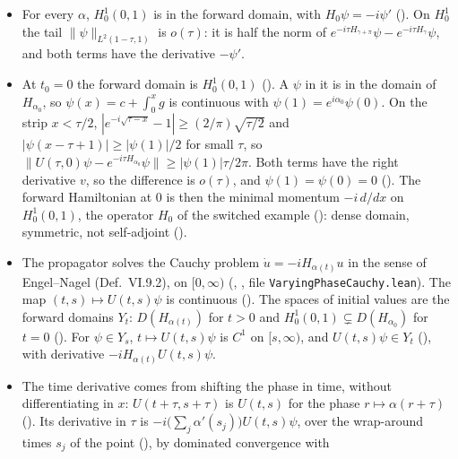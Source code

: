 \documentclass[11pt]{article}
\begin{document}
\begin{itemize}
\begin{itemize}
    every $t_0 \ne 0$ (): there the forward Hamiltonian is the
    self-adjoint $H_{\alpha(t_0)}$.
  \item For every $\alpha$, $H^1_0(0,1)$ is in the forward domain, with $H_0\psi = -i\psi'$
    (). On $H^1_0$ the tail
    $\|\psi\|_{L^2(1-\tau,1)}$ is $o(\tau)$: it is half the norm of
    $e^{-i\tau H_{\gamma+\pi}}\psi - e^{-i\tau H_\gamma}\psi$, and both terms have the derivative
    $-\psi'$.
  \item At $t_0 = 0$ the forward domain is $H^1_0(0,1)$ (). A $\psi$
    in it is in the domain of $H_{\alpha_0}$, so $\psi(x) = c + \int_0^x g$ is continuous with
    $\psi(1) = e^{i\alpha_0}\psi(0)$. On the strip $x < \tau/2$,
    $|e^{-i\sqrt{\tau - x}} - 1| \ge (2/\pi)\sqrt{\tau/2}$ and $|\psi(x - \tau + 1)| \ge |\psi(1)|/2$
    for small $\tau$, so $\|U(\tau,0)\psi - e^{-i\tau H_{\alpha_0}}\psi\| \ge |\psi(1)|\tau/2\pi$.
    Both terms have the right derivative $v$, so the difference is $o(\tau)$, and
    $\psi(1) = \psi(0) = 0$ (). The forward
    Hamiltonian at $0$ is then the minimal momentum $-i\,d/dx$ on $H^1_0(0,1)$, the operator
    $H_0$ of the switched example (): dense domain, symmetric,
    not self-adjoint ().
  \item The propagator solves the Cauchy problem $\dot u = -iH_{\alpha(t)}u$ in the sense of
    Engel--Nagel (Def.~VI.9.2), on $[0,\infty)$ (,
    , file \texttt{VaryingPhaseCauchy.lean}). The map
    $(t,s) \mapsto U(t,s)\psi$ is continuous (). The
    spaces of initial values are the forward domains $Y_t$: $D(H_{\alpha(t)})$ for $t > 0$ and
    $H^1_0(0,1) \subsetneq D(H_{\alpha_0})$ for $t = 0$ (). For
    $\psi \in Y_s$, $t \mapsto U(t,s)\psi$ is $C^1$ on $[s,\infty)$, and $U(t,s)\psi \in Y_t$
    (), with derivative $-iH_{\alpha(t)}U(t,s)\psi$.
  \item The time derivative comes from shifting the phase in time, without differentiating in
    $x$: $U(t+\tau,s+\tau)$ is $U(t,s)$ for the phase $r \mapsto \alpha(r+\tau)$
    (). Its derivative in $\tau$ is
    $-i\bigl(\sum_j \alpha'(s_j)\bigr)U(t,s)\psi$, over the wrap-around times $s_j$ of the point
    (), by dominated convergence with

\end{itemize}
\end{itemize}
\end{document}
